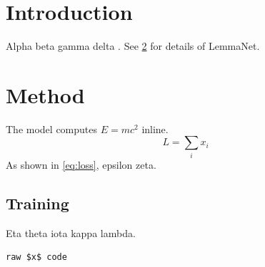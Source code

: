 \documentclass[11pt]{article}
\newcommand{\ourmethod}{LemmaNet}
\begin{document}
\section{Introduction}\label{sec:intro}
Alpha beta gamma delta \cite{knuth1984}.
See \ref{sec:method} for details of \ourmethod.

\section{Method}\label{sec:method}
The model computes $E = mc^2$ inline.
\begin{equation}\label{eq:loss}
  L = \sum_i x_i
\end{equation}
As shown in \eqref{eq:loss}, epsilon zeta.

\subsection{Training}
Eta theta iota kappa lambda.
\begin{verbatim}
raw $x$ code
\end{verbatim}
\end{document}

